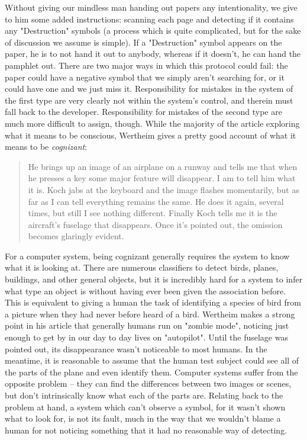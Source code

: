 \documentclass[12]{article}
\begin{document}
		Without giving our mindless man handing out papers any intentionality, we give to him some added instructions: scanning each page and detecting if it contains any "Destruction" symbols (a process which is quite complicated, but for the sake of discussion we assume is simple). If a "Destruction" symbol appears on the paper, he is to not hand it out to anybody, whereas if it doesn't, he can hand the pamphlet out. There are two major ways in which this protocol could fail: the paper could have a negative symbol that we simply aren't searching for, or it could have one and we just miss it. Responsibility for mistakes in the system of the first type are very clearly not within the system's control, and therein must fall back to the developer. Responsibility for mistakes of the second type are much more difficult to assign, though. While the majority of the article exploring what it means to be conscious, Wertheim gives a pretty good account of what it means to be \textit{cognizant}\cite{zombie_within}:

		\begin{quote}
			He brings up an image of an airplane on a runway and tells me that when he presses a key some major feature will disappear. I am to tell him what it is. Koch jabs at the keyboard and the image flashes momentarily, but as far as I can tell everything remains the same. He does it again, several times, but still I see nothing different. Finally Koch tells me it is the aircraft’s fuselage that disappears. Once it’s pointed out, the omission becomes glaringly evident.
		\end{quote}
		
		For a computer system, being cognizant generally requires the system to know what it is looking at. There are numerous classifiers to detect birds, planes, buildings, and other general objects, but it is incredibly hard for a system to infer what type an object is without having ever been given the association before. This is equivalent to giving a human the task of identifying a species of bird from a picture when they had never before heard of a bird. Wertheim makes a strong point in his article that generally humans run on "zombie mode"\cite{zombie_within}, noticing just enough to get by in our day to day lives on "autopilot"\cite{zombie_within}. Until the fuselage was pointed out, its disappearance wasn't noticeable to most humans. In the meantime, it is reasonable to assume that the human test subject could see all of the parts of the plane and even identify them. Computer systems suffer from the opposite problem -- they can find the differences between two images or scenes, but don't intrinsically know what each of the parts are. Relating back to the problem at hand, a system which can't observe a symbol, for it wasn't shown what to look for, is not its fault, much in the way that we wouldn't blame a human for not noticing something that it had no reasonable way of detecting.
\end{document}
